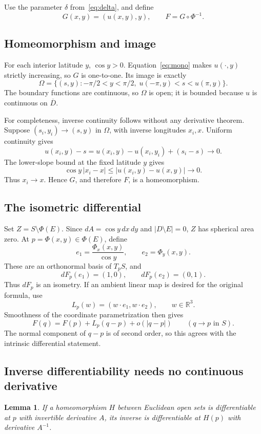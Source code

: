 \documentclass[11pt,letterpaper]{article}
\numberwithin{equation}{section}
\newtheorem{lemma}[theorem]{Lemma}
\theoremstyle{remark}
\newcommand{\R}{\mathbb R}
\newcommand{\closure}[1]{\overline{#1}}
\begin{document}
Use the parameter $\delta$ from~\eqref{eq:delta}, and define
\[
 G(x,y)=(u(x,y),y),\qquad F=G\circ\Phi^{-1}.
\]

\subsection{Homeomorphism and image}

For each interior latitude $y$, $\cos y>0$. Equation~\eqref{eq:mono} makes $u(\cdot,y)$ strictly increasing, so $G$ is one-to-one. Its image is exactly
\begin{equation}\label{eq:Omega}
 \Omega=\{(s,y):-\pi/2<y<\pi/2,\;
 u(-\pi,y)<s<u(\pi,y)\}.
\end{equation}
The boundary functions are continuous, so $\Omega$ is open; it is bounded because $u$ is continuous on $\closure D$.

For completeness, inverse continuity follows without any derivative theorem. Suppose $(s_i,y_i)\to(s,y)$ in $\Omega$, with inverse longitudes $x_i,x$. Uniform continuity gives
\[
 u(x_i,y)-s
 =u(x_i,y)-u(x_i,y_i)+(s_i-s)\longrightarrow0.
\]
The lower-slope bound at the fixed latitude $y$ gives
\[
 \cos y\,|x_i-x|\le|u(x_i,y)-u(x,y)|\longrightarrow0.
\]
Thus $x_i\to x$. Hence $G$, and therefore $F$, is a homeomorphism.

\subsection{The isometric differential}

Set $Z=S\setminus\Phi(E)$. Since $dA=\cos y\,dx\,dy$ and $|D\setminus E|=0$, $Z$ has spherical area zero. At $p=\Phi(x,y)\in\Phi(E)$, define
\[
 e_1=\frac{\Phi_x(x,y)}{\cos y},\qquad e_2=\Phi_y(x,y).
\]
These are an orthonormal basis of $T_pS$, and
\[
 dF_p(e_1)=(1,0),\qquad dF_p(e_2)=(0,1).
\]
Thus $dF_p$ is an isometry. If an ambient linear map is desired for the original formula, use
\[
 L_p(w)=(w\mathbin{\cdot}e_1,w\mathbin{\cdot}e_2),\qquad w\in\R^3.
\]
Smoothness of the coordinate parametrization then gives
\[
 F(q)=F(p)+L_p(q-p)+o(|q-p|)\qquad(q\to p\text{ in }S).
\]
The normal component of $q-p$ is of second order, so this agrees with the intrinsic differential statement.

\subsection{Inverse differentiability needs no continuous derivative}

\begin{lemma}\label{lem:inverse}
If a homeomorphism $H$ between Euclidean open sets is differentiable at $p$ with invertible derivative $A$, its inverse is differentiable at $H(p)$ with derivative $A^{-1}$.
\end{lemma}
\end{document}
